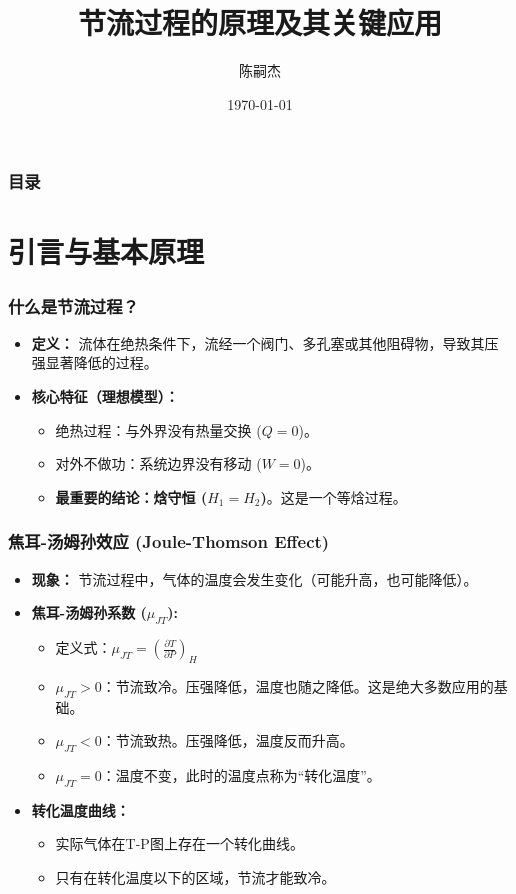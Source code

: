 \documentclass{beamer}
\title{节流过程的原理及其关键应用}
\author{陈嗣杰}
\institute{课程：热力学与统计物理}
\date{\today}
\begin{document}
\begin{frame}
  \titlepage
\end{frame}

\begin{frame}
  \frametitle{目录}
  \tableofcontents
\end{frame}


\section{引言与基本原理}

\begin{frame}
  \frametitle{什么是节流过程？}
  \begin{itemize}
    \item<1-> \textbf{定义：} 流体在\alert{绝热}条件下，流经一个阀门、多孔塞或其他阻碍物，导致其\alert{压强显著降低}的过程。
    \vfill
    \item<2-> \textbf{核心特征（理想模型）：}
    \begin{itemize}
      \item 绝热过程：与外界没有热量交换 ($Q=0$)。
      \item 对外不做功：系统边界没有移动 ($W=0$)。
      \item<3-> \textbf{\alert{最重要的结论：焓守恒 ($H_1 = H_2$)}}。这是一个等焓过程。
    \end{itemize}
  \end{itemize}
\end{frame}

\begin{frame}
  \frametitle{焦耳-汤姆孙效应 (Joule-Thomson Effect)}
  \begin{itemize}
    \item \textbf{现象：} 节流过程中，气体的\alert{温度会发生变化}（可能升高，也可能降低）。
    \vfill
    \item \textbf{焦耳-汤姆孙系数 ($\mu_{JT}$):}
    \begin{itemize}
      \item 定义式：$\mu_{JT} = \left(\frac{\partial T}{\partial P}\right)_H$
      \item $\mu_{JT} > 0$：\alert{节流致冷}。压强降低，温度也随之降低。这是绝大多数应用的基础。
      \item $\mu_{JT} < 0$：节流致热。压强降低，温度反而升高。
      \item $\mu_{JT} = 0$：温度不变，此时的温度点称为“转化温度”。
    \end{itemize}
    \vfill
    \item \textbf{转化温度曲线：}
    \begin{itemize}
      \item 实际气体在T-P图上存在一个转化曲线。
      \item 只有在\alert{转化温度以下的区域}，节流才能致冷。
    \end{itemize}
  \end{itemize}
\end{frame}
\end{document}
